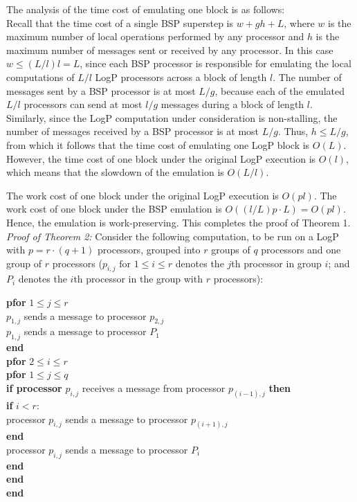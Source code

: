 \documentclass[12pt,a4paper]{article}
\begin{document}
The analysis of the time cost of emulating one block is as follows:\\
Recall that the time cost of a single BSP superstep is $w + gh + L$, where $w$ is the maximum number of local operations performed by any
processor and $h$ is the maximum number of messages sent or received by any processor. In this case $w \leq (L / l)l = L$, since each BSP processor
is responsible for emulating the local computations of $L/l$ LogP processors across a block of length $l$. The number of messages sent by a BSP
processor is at most $L/g$, because each of the emulated $L/l$ processors can send at most $l/g$ messages during a block of length $l$. Similarly,
since the LogP computation under consideration is non-stalling,
the number of messages received by a BSP processor is at most $L/g$. Thus, $h \leq L/g$, from which it follows that the time cost of emulating one
LogP block is $O(L)$. However, the time cost of one block under the original LogP execution is $O(l)$, which means that the slowdown of the
emulation is $O(L/l)$.

The work cost of one block under the original LogP execution is $O(pl)$. The work cost of one block under the BSP emulation is 
$O((l/L)p \cdot L) = O(pl)$. Hence, the emulation is work-preserving. This completes the proof of Theorem 1.\\


\noindent\emph{Proof of Theorem 2:}
Consider the following computation, to be run on a LogP with $p = r \cdot (q + 1)$ processors, grouped into $r$ groups of $q$ processors and one
group of $r$ processors ($p_{i, j} \mbox{ for } 1 \leq i \leq r$ denotes the $j$th processor in group $i$; and $P_i$ denotes the $i$th processor in
the group with $r$ processors):

\noindent\textbf{pfor} $1 \leq j \leq r$ \\
\indent $p_{1, j}$ sends a message to processor $p_{2, j}$ \\
\indent $p_{1, j}$ sends a message to processor $P_1$\\
\textbf{end} \\
\textbf{pfor} $2 \leq i \leq r$ \\
\indent \textbf{pfor} $1 \leq j \leq q $ \\
\indent \indent \textbf{if processor} $p_{i, j}$ receives a message from processor $p_{(i-1), j}$ \textbf{then} \\
\indent \indent \indent \textbf{if} $i < r$: \\
\indent \indent \indent \indent processor $p_{i, j}$ sends a message to processor $p_{(i+1), j}$ \\
\indent \indent \indent \textbf{end} \\
\indent \indent \indent processor $p_{i, j}$ sends a message to processor $P_i$ \\
\indent \indent \textbf{end} \\
\indent \textbf{end} \\
\textbf{end} \\
\end{document}
